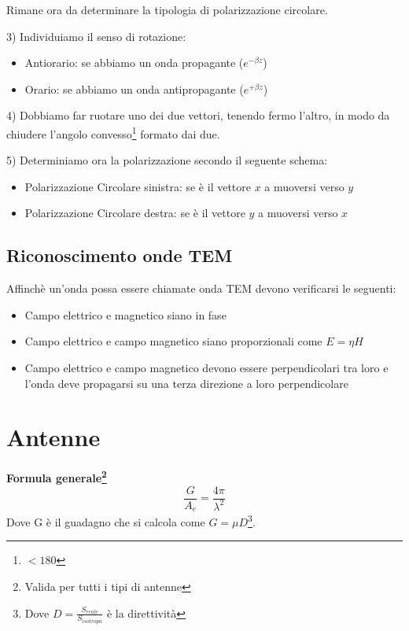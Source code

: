 \documentclass[10pt,a4paper]{report}
\begin{document}
	Rimane ora da determinare la tipologia di polarizzazione circolare.
	
	\raggedright{3) Individuiamo il senso di rotazione:}

	\begin{itemize}

	\item Antiorario: se abbiamo un onda propagante ($e^{-\beta z}$)
	\item Orario: se abbiamo un onda antipropagante ($e^{+\beta z}$)

	\end{itemize}
	\raggedright{4) Dobbiamo far ruotare uno dei due vettori, tenendo fermo l'altro, in modo da chiudere l'angolo convesso\footnote{$<180$} formato dai due.}

	\raggedright{	5) Determiniamo ora la polarizzazione secondo il seguente schema:}

	\begin{itemize}
	\item Polarizzazione Circolare sinistra: se è il vettore $x$ a muoversi verso $y$ 
	\item Polarizzazione Circolare destra: se è il vettore $y$ a muoversi verso $x$ 
	\end{itemize}	


	\section{Riconoscimento onde TEM}
	Affinchè un'onda possa essere chiamate onda TEM devono verificarsi le seguenti:

	\begin{itemize}

	\item Campo elettrico e magnetico siano in fase 

	\item Campo elettrico e campo magnetico siano proporzionali come $E=\eta H$

	\item Campo elettrico e campo magnetico devono essere perpendicolari tra loro e l'onda deve propagarsi su una terza direzione a loro perpendicolare

	\end{itemize}



\chapter{Antenne}
		\textbf{Formula generale\footnote{Valida per tutti i tipi di antenne}}
		\begin{equation}
		\frac{G}{A_e}=\frac{4\pi}{\lambda^2}
		\end{equation}
	    Dove G è il guadagno che si calcola come $G=\mu D$\footnote{Dove $D=\frac{S_{reale}}{S_{isotropa}}$ è la direttività}.
\end{document}
